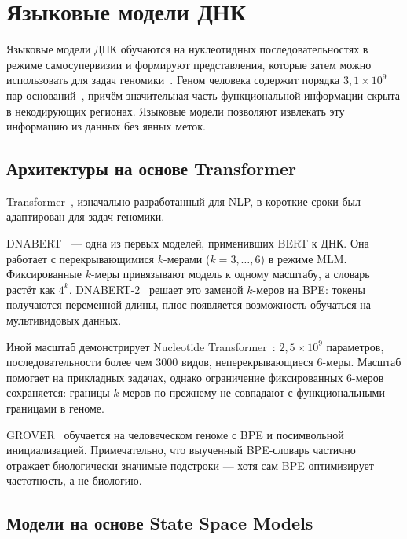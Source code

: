 \section{Языковые модели ДНК}

Языковые модели ДНК обучаются на нуклеотидных последовательностях в
режиме самосупервизии и формируют представления, которые затем можно
использовать для задач
геномики~\cite{benegasGenomicLanguageModels2024,ruanLargeLanguageModels2025}.
Геном человека содержит порядка $3{,}1 \times 10^9$ пар
оснований~\cite{nurgalievT2TCHm13CompleteHuman2022}, причём
значительная часть функциональной информации скрыта в некодирующих
регионах. Языковые модели позволяют извлекать эту информацию из
данных без явных меток.

\subsection{Архитектуры на основе Transformer}

Transformer~\cite{vaswaniAttentionAllYou2017}, изначально разработанный
для NLP, в короткие сроки был адаптирован для задач геномики.

DNABERT~\cite{jiDNABERTPretrainedBidirectional2021} --- одна из
первых моделей, применивших BERT к ДНК. Она работает с
перекрывающимися $k$-мерами ($k = 3, \ldots, 6$) в режиме MLM.
Фиксированные $k$-меры привязывают модель к одному масштабу, а
словарь растёт как $4^k$.
DNABERT-2~\cite{zhouDNABERT2EfficientFoundation2024} решает это
заменой $k$-меров на BPE: токены получаются переменной длины, плюс
появляется возможность обучаться на мультивидовых данных.

Иной масштаб демонстрирует Nucleotide
Transformer~\cite{dalla-torreNucleotideTransformerBuilding2025}:
$2{,}5 \times 10^9$ параметров, последовательности более чем 3000
видов, неперекрывающиеся 6-меры. Масштаб помогает на
прикладных задачах, однако ограничение фиксированных 6-меров сохраняется:
границы $k$-меров по-прежнему не совпадают с функциональными границами в геноме.

GROVER~\cite{groverLearnsSequenceContext2024} обучается на
человеческом геноме с BPE и посимвольной инициализацией.
Примечательно, что выученный BPE-словарь частично отражает
биологически значимые подстроки --- хотя сам BPE оптимизирует
частотность, а не биологию.

\subsection{Модели на основе State Space Models}

